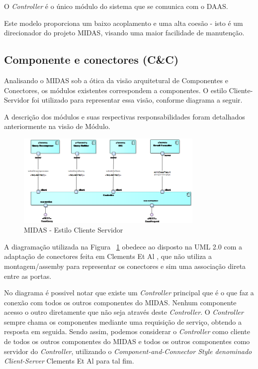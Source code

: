 \documentclass[11pt,a4paper]{article}
\begin{document}
O \textit{Controller} é o único módulo do sistema que se comunica com o DAAS. 

Este modelo proporciona um baixo acoplamento e uma alta coesão - isto é um direcionador do projeto MIDAS, visando uma maior facilidade de manutenção. 



\newpage

\subsection{Componente e conectores (C\&C)}
\label{subsec:cc}
Analisando o MIDAS sob a ótica da visão arquitetural de Componentes e Conectores, os módulos existentes correspondem a componentes. O estilo Cliente-Servidor foi utilizado para representar essa visão, conforme diagrama a seguir.

A descrição dos módulos e suas respectivas responsabilidades foram detalhados  anteriormente na visão de Módulo.

\begin{figure} [h!]
  \centering
    \includegraphics[width=0.8\textwidth]{MIDAS_-_Estilo_Cliente_Servidor}
  \caption{MIDAS - Estilo Cliente Servidor}
  \label{cliente}
\end{figure}

A diagramação utilizada na Figura ~\ref{cliente} obedece ao disposto na UML 2.0 com a adaptação de conectores feita em Clements Et Al \cite{clements2002documenting}, que não utiliza a montagem/assemby para representar os conectores e sim uma associação direta entre as portas.

No diagrama é possivel notar que existe um \textit{Controller} principal que é o que faz a conexão com todos os outros componentes do MIDAS. Nenhum componente acesso o outro diretamente que não seja através deste \textit{Controller}. O \textit{Controller} sempre chama os componentes mediante uma requisição de serviço, obtendo a resposta em seguida. Sendo assim, podemos considerar o \textit{Controller} como cliente de todos os outros componentes do MIDAS e todos os outros componentes como servidor do \textit{Controller}, utilizando o \textit{Component-and-Connector Style denominado  Client-Server} Clements Et Al \cite{clements2002documenting} para tal fim.
\end{document}

